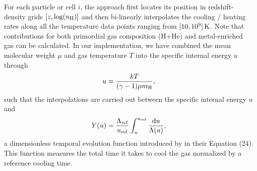 \documentclass[a4paper,fleqn,usenatbib,useAMS, twocolumn]{mnras}
\begin{document}
For each particle or cell $i$, the approach first locates its
position in redshift-density grids $[z, \log(n_{\rm H})]$ and then
bi-linearly interpolates the cooling / heating rates along all the
temperature data points ranging from $[10, 10^9]\, \rm{K}$. Note that
contributions for both primordial gas composition (H+He) and 
metal-enriched gas can be calculated. In our implementation, we have combined 
the mean molecular weight $\mu$ and gas temperature $T$ into the specific
internal energy $u$ through
\begin{equation}\\
u = \frac{kT}{(\gamma-1) \mu m_{\rm H}}, 
\label{eq:temp_u_conversion}
\end{equation}
such that the interpolations are carried out between the specific internal energy $u$ and  
\begin{equation}
\\
Y(u) = \frac{\Lambda_{\rm ref}}{u_{\rm ref}} \int_{u}^{u_{\rm ref}} \frac {{\rm d}u} {\Lambda(u)},
\end{equation}
a dimensionless temporal evolution function introduced by 
\cite{Townsend2009} in their Equation (24). 
This function measures the total time it takes to cool the gas 
normalized by a reference cooling time.
\end{document}
